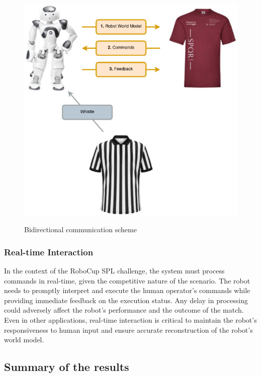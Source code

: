 \documentclass[a4paper, onecolumn, 12pt]{article}
\begin{document}
\begin{figure}
    \centering
    \includegraphics[width=0.7\linewidth]{assets/bidirectional-communication.png}
    \label{fig:bidirectional-communication}
    \caption{Bidirectional communication scheme}
\end{figure}


\subsubsection{Real-time Interaction}
In the context of the RoboCup SPL challenge, the system must process commands in real-time, given the 
competitive nature of the scenario. The robot needs to promptly interpret and execute the human operator's 
commands while providing immediate feedback on the execution status. Any delay in processing could adversely 
affect the robot's performance and the outcome of the match. Even in other applications, real-time interaction 
is critical to maintain the robot's responsiveness to human input and ensure accurate reconstruction of the robot's world model.

\subsection{Summary of the results}
\label{sec:summary}
\end{document}
